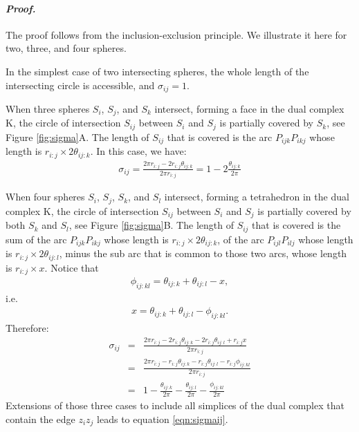 \documentclass[11 pt]{article}
\theoremstyle{plain} \theorembodyfont{\rmfamily}
\begin{document}
 \paragraph{\emph{Proof.}}  The proof follows from the inclusion-exclusion principle. We illustrate it here for two, three, and four spheres.

In the simplest case of two intersecting spheres, the whole length of the intersecting circle is accessible, and $\sigma_{ij} = 1$.

When three spheres $S_i$, $S_j$, and $S_k$ intersect, forming a face in the dual complex K, the circle of intersection $S_{ij}$ between $S_i$ and $S_j$ is partially covered by $S_k$, see Figure \ref{fig:sigma}A. The length of $S_{ij}$ that is covered is the arc $P_{ijk} P_{ikj}$ whose length is $r_{i:j}\times 2\theta_{ij:k}$. In this case, we have:
\begin{eqnarray}
\sigma_{ij} = \frac{ 2\pi r_{i:j} - 2r_{i:j} \theta_{ij:k}}{2\pi r_{i:j}} = 1 - 2\frac{\theta_{ij:k}}{2\pi}
\end{eqnarray}

When four spheres $S_i$, $S_j$, $S_k$, and $S_l$ intersect, forming a tetrahedron in the dual complex K, the circle of intersection $S_{ij}$ between $S_i$ and $S_j$ is partially covered by both $S_k$ and $S_l$, see Figure \ref{fig:sigma}B. The length of $S_{ij}$ that is covered is the sum of the arc $P_{ijk} P_{ikj}$ whose length is $r_{i:j}\times 2\theta_{ij:k}$, of the arc $P_{ijl} P_{ilj}$ whose length is $r_{i:j}\times 2\theta_{ij:l}$, minus the sub arc that is common to those two arcs, whose length is $r_{i:j}\times x$. Notice that
\begin{eqnarray*}
\phi_{ij:kl} = \theta_{ij:k} + \theta_{ij:l} - x,
\end{eqnarray*}
i.e. 
\begin{eqnarray*}
x =  \theta_{ij:k} + \theta_{ij:l} - \phi_{ij:kl}.
\end{eqnarray*}
Therefore:
\begin{eqnarray}
\sigma_{ij} &=& \frac{ 2\pi r_{i:j} - 2r_{i:j} \theta_{ij:k} - 2r_{i:j} \theta_{ij:l} +r_{i:j} x}{2\pi r_{i:j}} \nonumber \\
&=& \frac{ 2\pi r_{i:j} - r_{i:j} \theta_{ij:k} - r_{i:j} \theta_{ij:l} - r_{i:j} \phi_{ij:kl}}{2\pi r_{i:j}} \nonumber \\
&=& 1 - \frac{\theta_{ij:k}}{2\pi} - \frac{\theta_{ij:l}}{2\pi} - \frac{\phi_{ij:kl}}{2\pi}
\end{eqnarray}
Extensions of those three cases to include all simplices of the dual complex that contain the edge $z_i z_j$ leads to equation \ref{eqn:sigmaij}.
\end{document}
